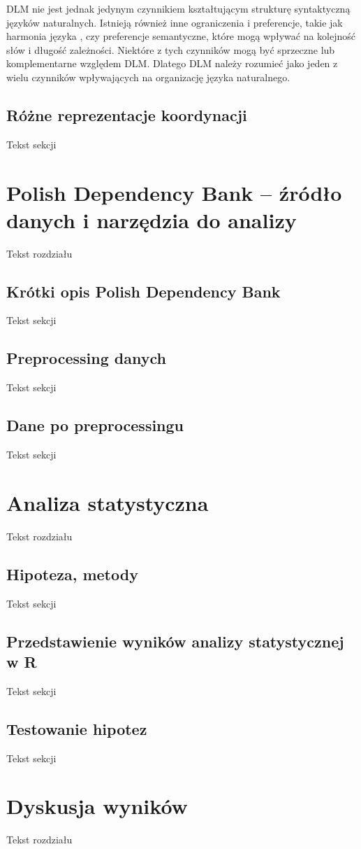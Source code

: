 \documentclass[licencjacka]{pracamgr_Kogni}
\begin{document}
DLM nie jest jednak jedynym czynnikiem kształtującym strukturę syntaktyczną języków naturalnych. Istnieją również inne ograniczenia i preferencje, takie jak harmonia języka \citep{Jing2022}, czy preferencje semantyczne, które mogą wpływać na kolejność słów i długość zależności. Niektóre z tych czynników mogą być sprzeczne lub komplementarne względem DLM. Dlatego DLM należy rozumieć jako jeden z wielu czynników wpływających na organizację języka naturalnego.

\section{Różne reprezentacje koordynacji}
Tekst sekcji

\chapter{Polish Dependency Bank -- źródło danych i narzędzia do analizy}
Tekst rozdziału
\section{Krótki opis Polish Dependency Bank}
Tekst sekcji
\section{Preprocessing danych}
Tekst sekcji
\section{Dane po preprocessingu}
Tekst sekcji

\chapter{Analiza statystyczna}
Tekst rozdziału
\section{Hipoteza, metody}
Tekst sekcji
\section{Przedstawienie wyników analizy statystycznej w R}
Tekst sekcji
\section{Testowanie hipotez}
Tekst sekcji

\chapter{Dyskusja wyników}
Tekst rozdziału
\end{document}
